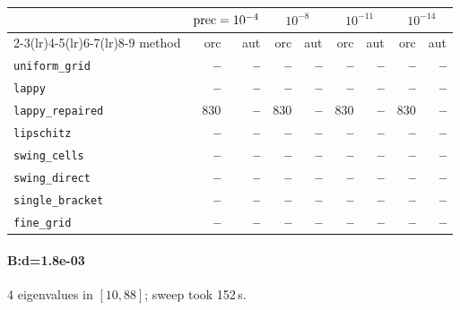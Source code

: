\begin{center}
\small
\begin{tabular}{lrrrrrrrr}
\toprule
& \multicolumn{2}{c}{$\mathrm{prec}=10^{-4}$} & \multicolumn{2}{c}{$10^{-8}$} & \multicolumn{2}{c}{$10^{-11}$} & \multicolumn{2}{c}{$10^{-14}$} \\
\cmidrule(lr){2-3}\cmidrule(lr){4-5}\cmidrule(lr){6-7}\cmidrule(lr){8-9}
method & orc & aut & orc & aut & orc & aut & orc & aut \\
\midrule
\texttt{uniform\_grid} & \textbf{--} & \textbf{--} & \textbf{--} & \textbf{--} & \textbf{--} & \textbf{--} & \textbf{--} & \textbf{--} \\
\texttt{lappy} & \textbf{--} & \textbf{--} & \textbf{--} & \textbf{--} & \textbf{--} & \textbf{--} & \textbf{--} & \textbf{--} \\
\texttt{lappy\_repaired} & 830 & \textbf{--} & 830 & \textbf{--} & 830 & \textbf{--} & 830 & \textbf{--} \\
\texttt{lipschitz} & \textbf{--} & \textbf{--} & \textbf{--} & \textbf{--} & \textbf{--} & \textbf{--} & \textbf{--} & \textbf{--} \\
\texttt{swing\_cells} & \textbf{--} & \textbf{--} & \textbf{--} & \textbf{--} & \textbf{--} & \textbf{--} & \textbf{--} & \textbf{--} \\
\texttt{swing\_direct} & \textbf{--} & \textbf{--} & \textbf{--} & \textbf{--} & \textbf{--} & \textbf{--} & \textbf{--} & \textbf{--} \\
\midrule
\texttt{single\_bracket} & \textbf{--} & \textbf{--} & \textbf{--} & \textbf{--} & \textbf{--} & \textbf{--} & \textbf{--} & \textbf{--} \\
\texttt{fine\_grid} & \textbf{--} & \textbf{--} & \textbf{--} & \textbf{--} & \textbf{--} & \textbf{--} & \textbf{--} & \textbf{--} \\
\bottomrule
\end{tabular}
\end{center}

\paragraph{B:d=1.8e-03} 4 eigenvalues in $[10, 88]$; sweep took 152\,s.

